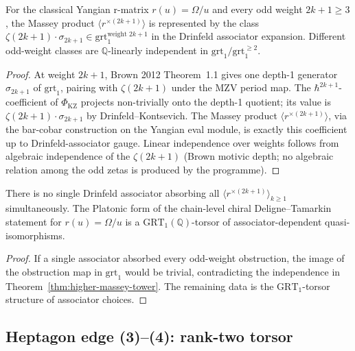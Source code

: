 \documentclass[11pt]{article}
\begin{document}
\begin{theorem}
\label{thm:higher-massey-tower}
For the classical Yangian r-matrix $r(u) = \Omega / u$ and every
odd weight $2k+1 \ge 3$, the Massey product
$\langle r^{\times (2k+1)} \rangle$ is represented by the
class
$\zeta(2k+1) \cdot \sigma_{2k+1}
\in \mathrm{grt}_1^{\text{weight } 2k+1}$
in the Drinfeld associator expansion. Different odd-weight classes are
$\mathbb{Q}$-linearly independent in
$\mathrm{grt}_1 / \mathrm{grt}_1^{\ge 2}$.
\end{theorem}

\begin{proof}
At weight $2k+1$, Brown 2012 Theorem~1.1 gives one depth-1 generator
$\sigma_{2k+1}$ of $\mathrm{grt}_1$, pairing with $\zeta(2k+1)$ under the
MZV period map. The $\hbar^{2k+1}$-coefficient of
$\Phi_{\mathrm{KZ}}$ projects non-trivially onto the depth-1 quotient;
its value is $\zeta(2k+1) \cdot \sigma_{2k+1}$ by Drinfeld--Kontsevich.
The Massey product $\langle r^{\times (2k+1)} \rangle$, via the
bar-cobar construction on the Yangian eval module, is exactly this
coefficient up to Drinfeld-associator gauge. Linear independence over
weights follows from algebraic independence of the $\zeta(2k+1)$ (Brown
motivic depth; no algebraic relation among the odd zetas is produced
by the programme).
\end{proof}

\begin{corollary}
\label{cor:associator-independent-fails}
There is no single Drinfeld associator absorbing all
$\langle r^{\times(2k+1)}\rangle_{k \ge 1}$ simultaneously. The
Platonic form of the chain-level chiral Deligne--Tamarkin statement for
$r(u) = \Omega / u$ is a $\mathrm{GRT}_1(\mathbb{Q})$-torsor of
associator-dependent quasi-isomorphisms.
\end{corollary}

\begin{proof}
If a single associator absorbed every odd-weight obstruction, the
image of the obstruction map in $\mathrm{grt}_1$ would be trivial,
contradicting the independence in Theorem~\ref{thm:higher-massey-tower}.
The remaining data is the $\mathrm{GRT}_1$-torsor structure of
associator choices.
\end{proof}

\subsection{Heptagon edge (3)--(4): rank-two torsor}
\label{subsec:heptagon-edge-3-4}
\end{document}
